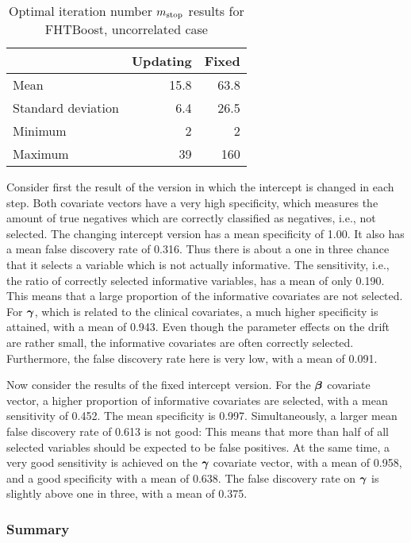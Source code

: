 \begin{table}
\caption{Optimal iteration number $m_{\text{stop}}$ results for FHTBoost, uncorrelated case}
\label{table:uncorrelated-mstop}
\centering
\begin{tabular}{l|rr}
\toprule
& Updating & Fixed \\
\hline
Mean               &  15.8  &  63.8  \\
Standard deviation &   6.4  &  26.5  \\
Minimum            &     2  &     2  \\
Maximum            &    39  &   160  \\
\bottomrule
\end{tabular}
\end{table}

Consider first the result of the version in which the intercept is changed in each step.
Both covariate vectors have a very high specificity, which measures the amount of true negatives which are correctly classified as negatives, i.e., not selected.
The changing intercept version has a mean specificity of 1.00.
It also has a mean false discovery rate of 0.316.
Thus there is about a one in three chance that it selects a variable which is not actually informative.
The sensitivity, i.e., the ratio of correctly selected informative variables, has a mean of only 0.190.
This means that a large proportion of the informative covariates are not selected.
For $\boldsymbol{\gamma}$, which is related to the clinical covariates, a much higher specificity is attained, with a mean of 0.943.
Even though the parameter effects on the drift are rather small, the informative covariates are often correctly selected.
Furthermore, the false discovery rate here is very low, with a mean of 0.091.

Now consider the results of the fixed intercept version.
For the $\boldsymbol{\beta}$ covariate vector, a higher proportion of informative covariates are selected, with a mean sensitivity of 0.452.
The mean specificity is 0.997.
Simultaneously, a larger mean false discovery rate of 0.613 is not good:
This means that more than half of all selected variables should be expected to be false positives.
At the same time, a very good sensitivity is achieved on the $\boldsymbol{\gamma}$ covariate vector, with a mean of 0.958, and a good specificity with a mean of 0.638.
The false discovery rate on $\boldsymbol{\gamma}$ is slightly above one in three, with a mean of 0.375.

\subsubsection{Summary}

